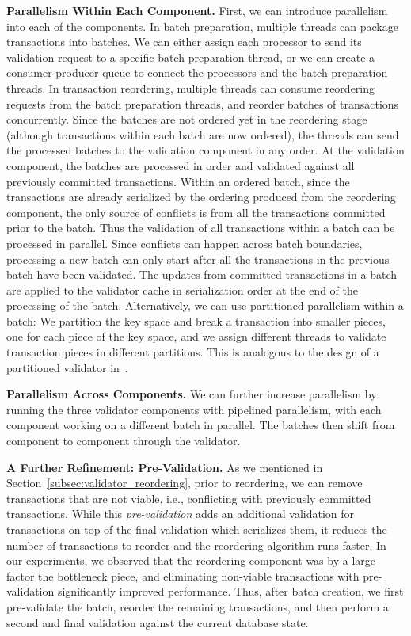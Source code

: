 {\bf Parallelism Within Each Component.}
First, we can introduce parallelism into each of the components. In batch preparation, multiple threads can package transactions into batches. We can either assign each processor to send its validation request to a specific batch preparation thread, or we can create a consumer-producer queue to connect the processors and the batch preparation threads. In transaction reordering, multiple threads can consume reordering requests from the batch preparation threads, and reorder batches of transactions concurrently. Since the batches are not ordered yet in the reordering stage (although transactions within each batch are now ordered), the threads can send the processed batches to the validation component in any order. At the validation component, the batches are processed in order and validated against all previously committed transactions. 
Within an ordered batch, since the transactions are already serialized by the ordering produced from the reordering component, the only source of conflicts is from all the transactions committed prior to the batch. Thus the validation of all transactions within a batch can be processed in parallel. Since conflicts can happen across batch boundaries, processing a new batch can only start after all the transactions in the previous batch have been validated. The updates from committed transactions in a batch are applied to the validator cache in serialization order at the end of the processing of the batch. Alternatively, we can use partitioned parallelism within a batch: We partition the key space and break a transaction into smaller pieces, one for each piece of the key space, and we assign different threads to validate transaction pieces in different partitions. This is analogous to the design of a partitioned validator in~\cite{ding2015centiman}.


{\bf Parallelism Across Components.}
We can further increase parallelism by running the three validator components with pipelined parallelism, 
with each component working on a different batch in parallel. The batches then shift from component to component through the validator.

{\bf A Further Refinement: Pre-Validation.} As we mentioned in Section~\ref{subsec:validator_reordering}, prior to reordering, we can remove transactions that are not viable, i.e., conflicting with previously committed transactions. While this \emph{pre-validation} adds an additional validation for transactions on top of the final validation which serializes them, it reduces the number of transactions to reorder and the reordering algorithm runs faster. In our experiments, we observed that the reordering component was by a large factor the bottleneck piece, and eliminating non-viable transactions with pre-validation significantly improved performance. Thus, after batch creation, we first pre-validate the batch, reorder the remaining transactions, and then perform a second and final validation against the current database state.

